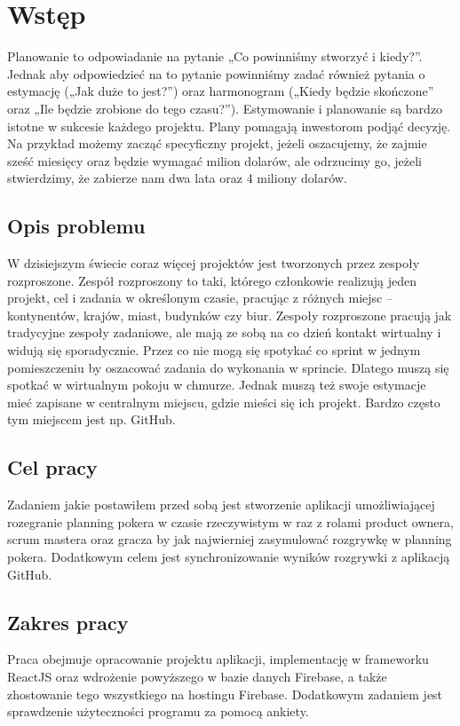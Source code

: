﻿\chapter*{Wstęp}

Planowanie to odpowiadanie na pytanie „Co powinniśmy stworzyć i kiedy?”.
Jednak aby odpowiedzieć na to pytanie powinniśmy zadać również pytania o estymację
(„Jak duże to jest?”) oraz harmonogram („Kiedy będzie skończone” oraz „Ile będzie zrobione do tego czasu?”). Estymowanie i planowanie są bardzo istotne w sukcesie każdego projektu. Plany pomagają inwestorom podjąć decyzję. Na przykład możemy zacząć specyficzny projekt, jeżeli oszacujemy, że zajmie sześć miesięcy oraz będzie wymagać milion dolarów, ale odrzucimy go, jeżeli stwierdzimy, że zabierze nam dwa lata oraz 4 miliony dolarów.\cite{Cohen_2006}

\section*{Opis problemu}

W dzisiejszym świecie coraz więcej projektów jest tworzonych przez zespoły rozproszone. Zespół rozproszony to taki, którego członkowie realizują jeden projekt, cel i zadania w określonym czasie, pracując z różnych miejsc – kontynentów, krajów, miast, budynków czy biur. Zespoły rozproszone pracują jak tradycyjne zespoły zadaniowe, ale mają ze sobą na co dzień kontakt wirtualny i widują się sporadycznie.\cite{www_rozproszony} Przez co nie mogą się spotykać co sprint w jednym pomieszczeniu by oszacować zadania do wykonania w sprincie. Dlatego muszą się spotkać w wirtualnym pokoju w chmurze. Jednak muszą też swoje estymacje mieć zapisane w centralnym miejscu, gdzie mieści się ich projekt. Bardzo często tym miejscem jest np. GitHub.

\section*{Cel pracy}

Zadaniem jakie postawiłem przed sobą jest stworzenie aplikacji umożliwiającej rozegranie planning pokera w czasie rzeczywistym w raz z rolami product ownera, scrum mastera oraz gracza by jak najwierniej zasymulować rozgrywkę w planning pokera. Dodatkowym celem jest synchronizowanie wyników rozgrywki z aplikacją GitHub.

\section*{Zakres pracy}

Praca obejmuje opracowanie projektu aplikacji, implementację w frameworku ReactJS oraz wdrożenie powyższego w bazie danych Firebase, a także zhostowanie tego wszystkiego na hostingu Firebase. Dodatkowym zadaniem jest sprawdzenie użyteczności programu za pomocą ankiety.

